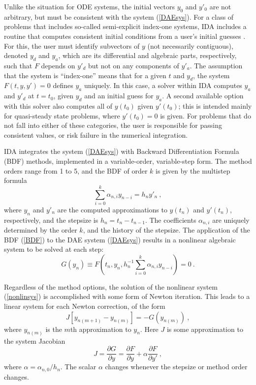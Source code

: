 Unlike the situation for ODE systems, the initial vectors $y_0$ and
$y'_0$ are not arbitrary, but must be consistent with the system
(\ref{DAEsys}).  For a class of problems that includes so-called
semi-explicit index-one systems, IDA includes a routine that computes
consistent initial conditions from a user's initial guesses
\cite{BrHiPe98}.  For this, the user must identify subvectors of $y$
(not necessarily contiguous), denoted $y_d$ and $y_a$, which are its
differential and algebraic parts, respectively, such that $F$ depends
on $y'_d$ but not on any components of $y'_a$.  The assumption that
the system is ``index-one'' means that for a given $t$ and $y_d$, the
system $F(t,y,y') = 0$ defines $y_a$ uniquely.  In this case, a solver
within IDA computes $y_a$ and $y'_d$ at $t = t_0$, given $y_d$ and an
initial guess for $y_a$.  A second available option with  this solver
also computes all of $y(t_0)$ given $y'(t_0)$; this is intended mainly
for quasi-steady state problems, where $y'(t_0) = 0$ is given.
For problems that do not fall into either of these categories, the
user is responsible for passing consistent values, or risk failure in
the numerical integration.

IDA integrates the system (\ref{DAEsys}) with Backward Differentiation
Formula (BDF) methods, implemented in a variable-order, variable-step
form.  The method orders range from 1 to 5, and the BDF of order $k$
is given by the multistep formula
\begin{equation}
\sum_{i=0}^k \alpha_{n,i}y_{n-i} = h_n y'_n ~,  \label{BDF}
\end{equation}
where $y_n$ and $y'_n$ are the computed approximations to $y(t_n)$
and $y'(t_n)$, respectively, and the stepsize is $h_n = t_n - t_{n-1}$.  
The coefficients $\alpha_{n,i}$ are uniquely determined by the order
$k$, and the history of the stepsize.  The application of the BDF
(\ref{BDF}) to the DAE system (\ref{DAEsys}) results in a nonlinear
algebraic system to be solved at each step:
\begin{equation}
G(y_n) \equiv F(t_n, y_n, h_n^{-1} \sum_{i=0}^k \alpha_{n,i}y_{n-i})
       = 0 ~.                                         \label{nonlinsys}
\end{equation}

Regardless of the method options, the solution of the nonlinear system
(\ref{nonlinsys}) is accomplished with some form of Newton iteration.
This leads to a linear system for each Newton correction, of the form
\begin{equation}
J [y_{n(m+1)} - y_{n(m)}] = -G(y_{n(m)})  ~, \label{Newtoncorr}
\end{equation}
where $y_{n(m)}$ is the $m$th approximation to $y_n$.  Here $J$ is 
some approximation to the system Jacobian
\begin{equation}
J = \frac{\partial G}{\partial y}
  = \frac{\partial F}{\partial y} + \alpha\frac{\partial F}{\partial y'}
                                                     ~, \label{sysjac}
\end{equation}
where $\alpha = \alpha_{n,0}/h_n$.  The scalar $\alpha$ changes 
whenever the stepsize or method order changes.

